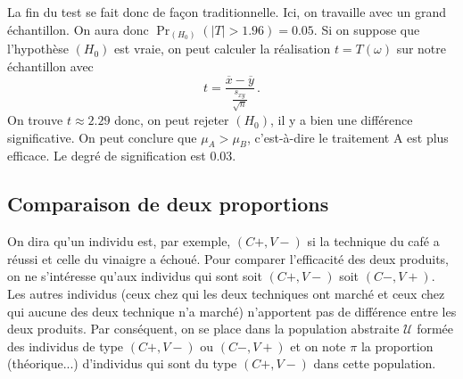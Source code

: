 \documentclass[12pt, a4paper]{book}
\numberwithin{equation}{section}
\begin{document}
La fin du test se fait donc de façon traditionnelle. Ici, on travaille avec un grand échantillon. On aura
donc $\Pr_{(H_0)}(|T|>1.96) = 0.05$. Si on suppose que l'hypothèse $(H_0)$ est vraie, on peut calculer la réalisation $t=T(\omega)$ sur notre échantillon avec  
$$
t = \frac{\overline{x}-\overline{y}}{\frac{s_{xy}}{\sqrt{n}}}\,.
$$
On trouve $t\approx 2.29$ donc, on 
peut rejeter $(H_0)$, il y a bien une différence significative. On peut conclure que $\mu_A > \mu_B$,
c'est-à-dire le traitement A est plus efficace. Le degré de signification est 0.03.


\subsection{Comparaison de deux proportions}



On dira qu'un individu est, par exemple, $(C+,V-)$ si la technique du café a réussi et celle du vinaigre
a échoué.
Pour comparer l'efficacité des deux produits, on ne s'intéresse qu'aux individus qui sont soit $(C+,V-)$ soit $(C-,V+)$. Les autres individus (ceux chez qui les deux techniques ont marché et ceux chez qui aucune
des deux technique n'a marché) n'apportent pas de différence entre les deux produits. 
Par conséquent, on se place dans la population abstraite $\mathcal{U}$ formée des individus de type 
$(C+,V-)$ ou  $(C-,V+)$ et on note $\pi$ la proportion (théorique...) d'individus qui sont du type $(C+,V-)$ dans cette population. 
\end{document}
